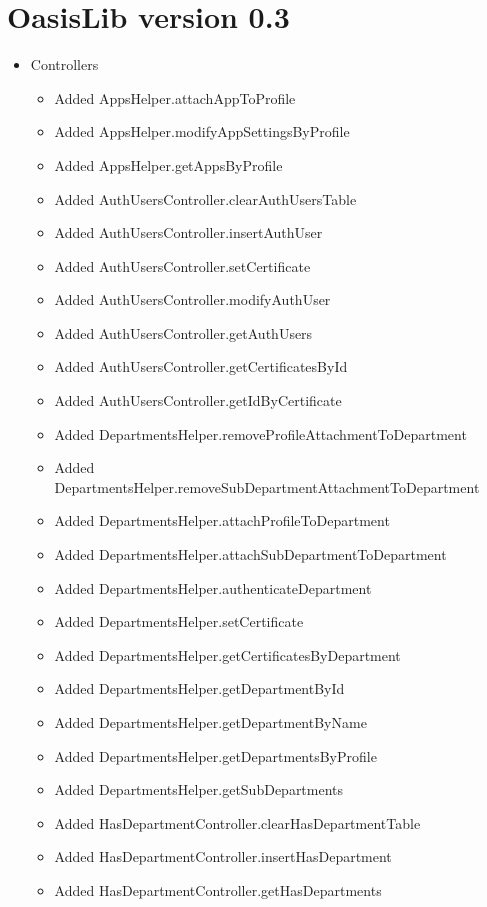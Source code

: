 \section{OasisLib version 0.3}
\begin{itemize}
	\item Controllers
	\begin{itemize}
		\item Added AppsHelper.attachAppToProfile
		\item Added AppsHelper.modifyAppSettingsByProfile
		\item Added AppsHelper.getAppsByProfile
		\item Added AuthUsersController.clearAuthUsersTable
		\item Added AuthUsersController.insertAuthUser
		\item Added AuthUsersController.setCertificate
		\item Added AuthUsersController.modifyAuthUser
		\item Added AuthUsersController.getAuthUsers
		\item Added AuthUsersController.getCertificatesById
		\item Added AuthUsersController.getIdByCertificate
		\item Added DepartmentsHelper.removeProfileAttachmentToDepartment
		\item Added DepartmentsHelper.removeSubDepartmentAttachmentToDepartment
		\item Added DepartmentsHelper.attachProfileToDepartment
		\item Added DepartmentsHelper.attachSubDepartmentToDepartment
		\item Added DepartmentsHelper.authenticateDepartment
		\item Added DepartmentsHelper.setCertificate
		\item Added DepartmentsHelper.getCertificatesByDepartment
		\item Added DepartmentsHelper.getDepartmentById
		\item Added DepartmentsHelper.getDepartmentByName
		\item Added DepartmentsHelper.getDepartmentsByProfile
		\item Added DepartmentsHelper.getSubDepartments
		\item Added HasDepartmentController.clearHasDepartmentTable
		\item Added HasDepartmentController.insertHasDepartment
		\item Added HasDepartmentController.getHasDepartments

\end{itemize}
\end{itemize}
